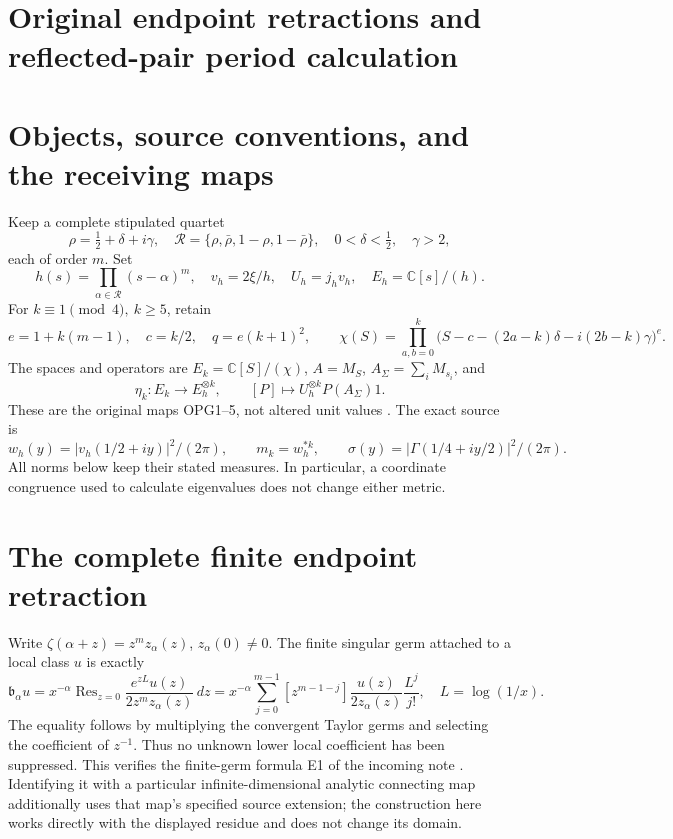 \clearpage
\begingroup
\def\Gram{\operatorname{Gram}}
\def\Res{\operatorname{Res}}
\def\im{\operatorname{im}}
\def\cond{\operatorname{cond}}

\setcounter{equation}{0}
\renewcommand{\theequation}{ET.\arabic{equation}}
\section*{Original endpoint retractions and reflected-pair period calculation}



\section{Objects, source conventions, and the receiving maps}
Keep a complete stipulated quartet
\[
 \rho=\tfrac12+\delta+i\gamma,\quad
 \mathcal R=\{\rho,\bar\rho,1-\rho,1-\bar\rho\},\quad
 0<\delta<\tfrac12,\quad\gamma>2,
\]
each of order \(m\). Set
\[
 h(s)=\prod_{\alpha\in\mathcal R}(s-\alpha)^m,\quad
 v_h=2\xi/h,\quad U_h=j_hv_h,\quad
 E_h=\mathbb C[s]/(h).
\]
For \(k\equiv1\pmod4,\ k\ge5\), retain
\[
 e=1+k(m-1),\quad c=k/2,\quad q=e(k+1)^2,\qquad
 \chi(S)=\prod_{a,b=0}^k
 \bigl(S-c-(2a-k)\delta-i(2b-k)\gamma\bigr)^e.
\]
The spaces and operators are \(E_k=\mathbb C[S]/(\chi)\),
\(A=M_S\), \(A_\Sigma=\sum_iM_{s_i}\), and
\[
 \eta_k:E_k\longrightarrow E_h^{\otimes k},\qquad
 [P]\longmapsto U_h^{\otimes k}P(A_\Sigma)1.                 \tag{ET1}
\]
These are the original maps OPG1--5, not altered unit values
\cite[OPG1--5]{et:Current}. The exact source is
\[
 w_h(y)=|v_h(1/2+iy)|^2/(2\pi),\qquad m_k=w_h^{*k},\qquad
 \sigma(y)=|\Gamma(1/4+iy/2)|^2/(2\pi).
                                                               \tag{ET2}
\]
All norms below keep their stated measures. In particular, a coordinate
congruence used to calculate eigenvalues does not change either metric.

\section{The complete finite endpoint retraction}
Write \(\zeta(\alpha+z)=z^m z_\alpha(z)\), \(z_\alpha(0)\ne0\).
The finite singular germ attached to a local class \(u\) is exactly
\[
 \mathfrak b_\alpha u
 =x^{-\alpha}\Res_{z=0}
       \frac{e^{zL}u(z)}{2z^mz_\alpha(z)}\,dz
 =x^{-\alpha}\sum_{j=0}^{m-1}
 [z^{m-1-j}]\frac{u(z)}{2z_\alpha(z)}\frac{L^j}{j!},
 \quad L=\log(1/x).                                    \tag{ET3}
\]
The equality follows by multiplying the convergent Taylor germs and
selecting the coefficient of \(z^{-1}\). Thus no unknown lower local
coefficient has been suppressed. This verifies the finite-germ formula
E1 of the incoming note \cite[E1]{et:Incoming}. Identifying it with a
particular infinite-dimensional analytic connecting map additionally
uses that map's specified source extension; the construction here works
directly with the displayed residue and does not change its domain.

